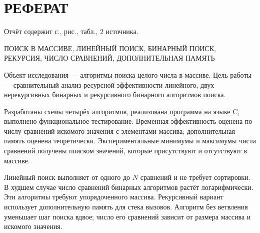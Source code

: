 \chapter*{РЕФЕРАТ}
Отчёт содержит \pageref{LastPage} с., \totalfigures{} рис., \totaltables{} табл., 2 источника.

ПОИСК В МАССИВЕ, ЛИНЕЙНЫЙ ПОИСК, БИНАРНЫЙ ПОИСК, РЕКУРСИЯ, ЧИСЛО СРАВНЕНИЙ, ДОПОЛНИТЕЛЬНАЯ ПАМЯТЬ

Объект исследования --- алгоритмы поиска целого числа в массиве. Цель работы --- сравнительный анализ ресурсной эффективности линейного, двух нерекурсивных бинарных и рекурсивного бинарного алгоритмов поиска.

Разработаны схемы четырёх алгоритмов, реализована программа на языке C, выполнено функциональное тестирование. Временная эффективность оценена по числу сравнений искомого значения с элементами массива; дополнительная память оценена теоретически. Экспериментальные минимумы и максимумы числа сравнений получены поиском значений, которые присутствуют и отсутствуют в массиве.

Линейный поиск выполняет от одного до $N$ сравнений и не требует сортировки. В худшем случае число сравнений бинарных алгоритмов растёт логарифмически. Эти алгоритмы требуют упорядоченного массива. Рекурсивный вариант использует дополнительную память для стека вызовов. Алгоритм без ветвления уменьшает шаг поиска вдвое; число его сравнений зависит от размера массива и искомого значения.
